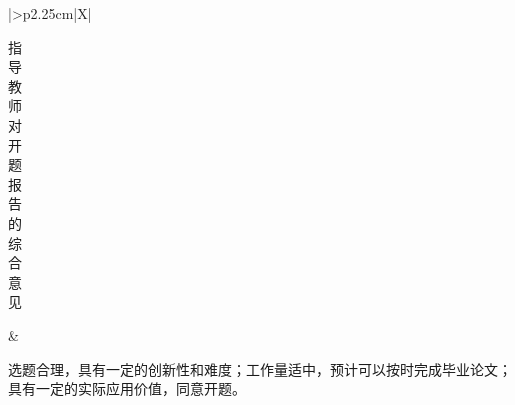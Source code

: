 \thispagestyle{plain}
\begingroup
{}
\setlength{\tabcolsep}{6pt}
\renewcommand{\arraystretch}{1.25}
\noindent\FrameTableIndent\begin{tabularx}{\FrameTabularWidth}{|>{\centering\arraybackslash}p{2.25cm}|X|}
  \hline
  \parbox[t][7.95cm][c]{2.05cm}{\centering 指\\导\\教\\师\\对\\开\\题\\报\\告\\的\\综\\合\\意\\见}
    & \parbox[t][7.95cm][t]{\linewidth}{选题合理，具有一定的创新性和难度；工作量适中，预计可以按时完成毕业论文；具有一定的实际应用价值，同意开题。

}
\end{tabularx}
